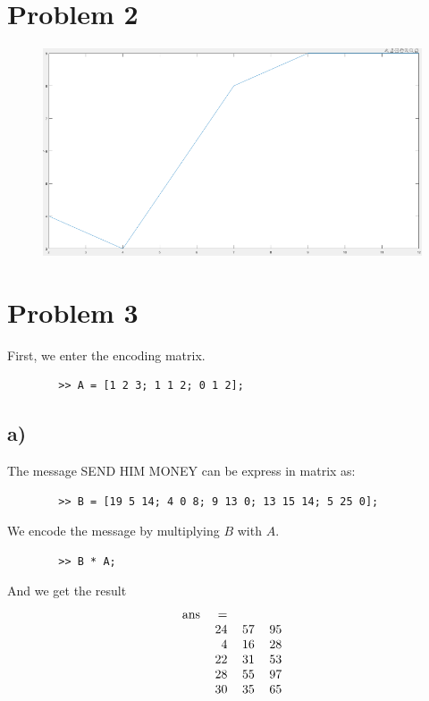 \documentclass[12pt,en,a4paper]{article}
\begin{document}
	\section*{Problem 2}
	\begin{figure}[H]
		\centering
		\includegraphics[scale=0.7]{prob2.png}
		\label{prob2}
	\end{figure}
	
	\newpage
	\section*{Problem 3}
	First, we enter the encoding matrix.
	\begin{mdframed}[hidealllines=true,backgroundcolor=magenta!10]
		\begin{lstlisting}
		>> A = [1 2 3; 1 1 2; 0 1 2];
		\end{lstlisting}
	\end{mdframed}
	\subsection*{a)}
	The message SEND HIM MONEY can be express in matrix as:
	\begin{mdframed}[hidealllines=true,backgroundcolor=magenta!10]
		\begin{lstlisting}
		>> B = [19 5 14; 4 0 8; 9 13 0; 13 15 14; 5 25 0];
		\end{lstlisting}
	\end{mdframed}
	We encode the message by multiplying $B$ with $A$.
	\begin{mdframed}[hidealllines=true,backgroundcolor=magenta!10]
		\begin{lstlisting}
		>> B * A;
		\end{lstlisting}
	\end{mdframed}
	And we get the result \\
	\[
	\begin{tabular}{l r r r}
	ans & = & & \\
	& 24 & 57 & 95 \\
	& 4 & 16 & 28 \\
	& 22 & 31 & 53 \\
	& 28 & 55 & 97 \\
	& 30 & 35 & 65
	\end{tabular}
	\]
\end{document}

